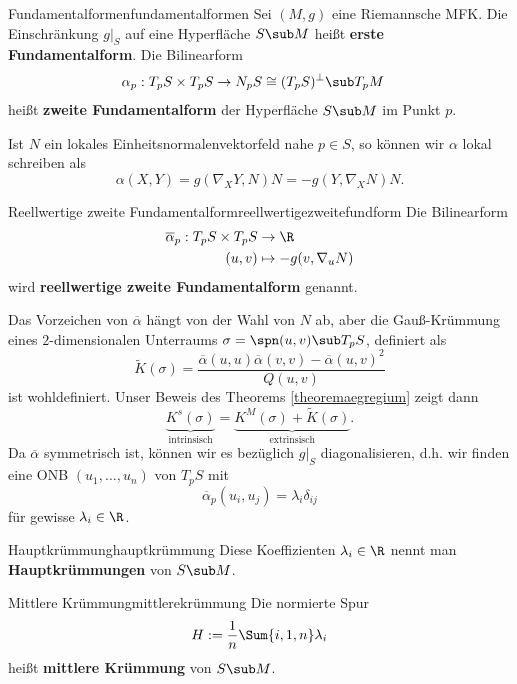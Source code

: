 \begin{definition}{Fundamentalformen}{fundamentalformen}
Sei $(M,g)$ eine Riemannsche MFK. Die Einschränkung $g|_S$ auf eine Hyperfläche $S \sub M$ heißt \textbf{erste Fundamentalform}.
Die Bilinearform
\begin{align}
\alpha_p: T_pS \times T_p S &\to N_pS \cong (T_pS)^{\perp} \sub T_pM
\end{align}
heißt \textbf{zweite Fundamentalform} der Hyperfläche $S \sub M$ im Punkt $p$.
\end{definition}
Ist $N$ ein lokales Einheitsnormalenvektorfeld nahe $p \in S$, so können wir $\alpha$ lokal schreiben als
\begin{equation}
\alpha(X,Y)=g(\nabla_XY,N)N=-g(Y,\nabla_XN)N.
\end{equation}
\begin{definition}{Reellwertige zweite Fundamentalform}{reellwertigezweitefundform}
Die Bilinearform
\begin{align}
\overline{\alpha}_p: T_pS \times T_pS &\to \R\\
(u,v) &\mapsto -g(v, \nabla_uN)
\end{align}
wird \textbf{reellwertige zweite Fundamentalform} genannt.
\end{definition}
Das Vorzeichen von $\overline{\alpha}$ hängt von der Wahl von $N$ ab, aber die Gauß-Krümmung eines $2$-dimensionalen Unterraums $\sigma = \spn (u,v) \sub T_pS$, definiert als
\begin{equation}
\tilde{K}(\sigma) = \frac{\overline{\alpha}(u,u)\overline{\alpha}(v,v)-\overline{\alpha}(u,v)^2}{Q(u,v)}
\end{equation}
ist wohldefiniert. Unser Beweis des Theorems \ref{theoremaegregium} zeigt dann
\begin{equation}
\underbrace{K^s(\sigma)}_\text{intrinsisch} = \underbrace{K^M(\sigma) + \tilde{K}(\sigma)}_\text{extrinsisch}.
\end{equation}
Da $\overline{\alpha}$ symmetrisch ist, können wir es bezüglich $g|_S$ diagonalisieren, d.h. wir finden eine ONB $(u_1, \dots, u_n)$ von $T_pS$ mit
\begin{equation}
\overline{\alpha}_p(u_i,u_j)=\lambda_i \delta_{ij}
\end{equation}
für gewisse $\lambda_i \in \R$.
\begin{definition}{Hauptkrümmung}{hauptkrümmung}
Diese Koeffizienten $\lambda_i \in \R$ nennt man \textbf{Hauptkrümmungen} von $S \sub M$.
\end{definition}
\begin{definition}{Mittlere Krümmung}{mittlerekrümmung}
Die normierte Spur
\begin{equation}
H:=\frac{1}{n} \Sum{i,1,n} \lambda_i
\end{equation}
heißt \textbf{mittlere Krümmung} von $S \sub M$.
\end{definition}
